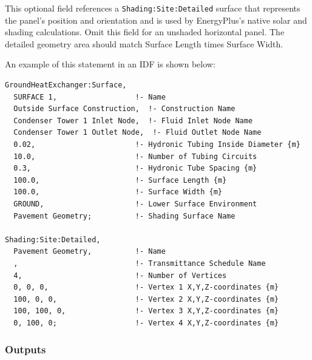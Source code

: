 This optional field references a \texttt{Shading:Site:Detailed} surface that represents the panel's position and orientation and is used by EnergyPlus's native solar and shading calculations. Omit this field for an unshaded horizontal panel. The detailed geometry area should match Surface Length times Surface Width.

An example of this statement in an IDF is shown below:

\begin{lstlisting}
GroundHeatExchanger:Surface,
  SURFACE 1,                  !- Name
  Outside Surface Construction,  !- Construction Name
  Condenser Tower 1 Inlet Node,  !- Fluid Inlet Node Name
  Condenser Tower 1 Outlet Node,  !- Fluid Outlet Node Name
  0.02,                       !- Hydronic Tubing Inside Diameter {m}
  10.0,                       !- Number of Tubing Circuits
  0.3,                        !- Hydronic Tube Spacing {m}
  100.0,                      !- Surface Length {m}
  100.0,                      !- Surface Width {m}
  GROUND,                     !- Lower Surface Environment
  Pavement Geometry;          !- Shading Surface Name

Shading:Site:Detailed,
  Pavement Geometry,          !- Name
  ,                           !- Transmittance Schedule Name
  4,                          !- Number of Vertices
  0, 0, 0,                    !- Vertex 1 X,Y,Z-coordinates {m}
  100, 0, 0,                  !- Vertex 2 X,Y,Z-coordinates {m}
  100, 100, 0,                !- Vertex 3 X,Y,Z-coordinates {m}
  0, 100, 0;                  !- Vertex 4 X,Y,Z-coordinates {m}
\end{lstlisting}

\subsubsection{Outputs}\label{outputs-13-000}

